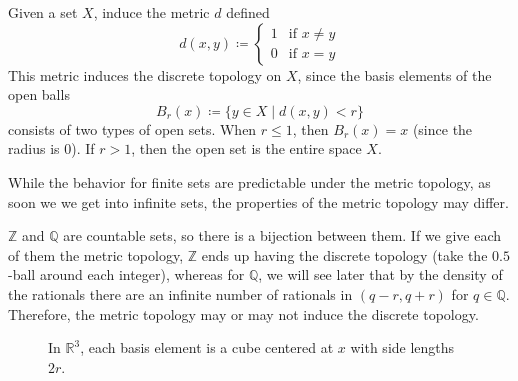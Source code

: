   \begin{example}
    Given a set $X$, induce the metric $d$ defined
    \begin{equation}
      d(x, y) \coloneqq \begin{cases} 1 & \text{if } x \neq y \\ 0 & \text{if } x = y \end{cases}
    \end{equation}
    This metric induces the discrete topology on $X$, since the basis elements of the open balls
    \begin{equation}
      B_r (x) \coloneqq \{ y \in X \mid d(x, y) <r\}
    \end{equation}
    consists of two types of open sets. When $r \leq 1$, then $B_r (x) = x$ (since the radius is $0$). If $r > 1$, then the open set is the entire space $X$. 
  \end{example} 

  While the behavior for finite sets are predictable under the metric topology, as soon we we get into infinite sets, the properties of the metric topology may differ. 

  \begin{example}
    $\mathbb{Z}$ and $\mathbb{Q}$ are countable sets, so there is a bijection between them. If we give each of them the metric topology, $\mathbb{Z}$ ends up having the discrete topology (take the $0.5$-ball around each integer), whereas for $\mathbb{Q}$, we will see later that by the density of the rationals there are an infinite number of rationals in $(q - r, q + r)$ for $q \in \mathbb{Q}$. Therefore, the metric topology may or may not induce the discrete topology. 
  \end{example}

  \begin{example}
    \begin{figure}[H]
      \centering 
      \caption{In $\mathbb{R}^3$, each basis element is a cube centered at $x$ with side lengths $2r$.} 
      \label{fig:sup_norm_R3}
    \end{figure}
  \end{example}

